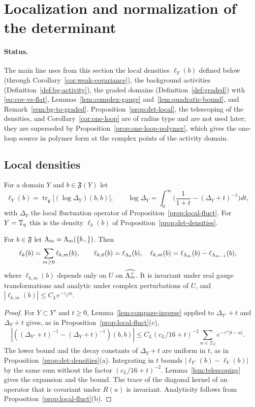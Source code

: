 \section{Localization and normalization of the determinant}\label{sec:det-local}

\paragraph{Status.} The main line uses from this section the local densities $\ell_Y(b)$ defined below (through Corollary~\ref{cor:weak-covariance}), the background activities (Definition~\ref{def:bg-activity}), the graded domains (Definition~\ref{def:graded}) with \eqref{eq:cov-vs-flat}, Lemmas~\ref{lem:complex-gauge} and~\ref{lem:quadratic-bound}, and Remark~\ref{rem:bg-to-graded}. Proposition~\ref{prop:det-local}, the telescoping of the densities, and Corollary~\ref{cor:one-loop} are of radius type and are not used later; they are superseded by Proposition~\ref{prop:one-loop-polymer}, which gives the one-loop source in polymer form at the complex points of the activity domain.

\subsection{Local densities}

For a domain $Y$ and $b\in\mathfrak F(Y)$ let
\[
\ell_Y(b)=\operatorname{tr}_{\mathfrak g}\big[(\log\Delta_Y)(b,b)\big],\qquad\log\Delta_Y=\int_0^\infty\Big(\frac1{1+t}-(\Delta_Y+t)^{-1}\Big)dt,
\]
with $\Delta_Y$ the local fluctuation operator of Proposition~\ref{prop:local-fluct}. For $Y=\mathbb T_\eta$ this is the density $\ell_k(b)$ of Proposition~\ref{prop:det-densities}.

\begin{proposition}\label{prop:det-local}
For $b\in\mathfrak F$ let $\Lambda_m=\Lambda_m(\{b_-\})$. Then
\[
\ell_k(b)=\sum_{m\ge0}\ell_{k,m}(b),\qquad\ell_{k,0}(b)=\ell_{\Lambda_0}(b),\quad\ell_{k,m}(b)=\ell_{\Lambda_m}(b)-\ell_{\Lambda_{m-1}}(b),
\]
where $\ell_{k,m}(b)$ depends only on $U$ on $\widehat{\Lambda_m^+}$. It is invariant under real gauge transformations and analytic under complex perturbations of $U$, and $|\ell_{k,m}(b)|\le C_Le^{-\gamma_3m}$.
\end{proposition}

\begin{proof}
For $Y\subset Y'$ and $t\ge0$, Lemma~\ref{lem:compare-inverse} applied to $\Delta_{Y'}+t$ and $\Delta_Y+t$ gives, as in Proposition~\ref{prop:local-fluct}(c),
\[
|((\Delta_{Y'}+t)^{-1}-(\Delta_Y+t)^{-1})(b,b)|\le C_L(c_L/16+t)^{-2}\sum_{w\in\Sigma_Y}e^{-\gamma''|b-w|} .
\]
The lower bound and the decay constants of $\Delta_Y+t$ are uniform in $t$, as in Proposition~\ref{prop:det-densities}(a). Integrating in $t$ bounds $|\ell_{Y'}(b)-\ell_Y(b)|$ by the same sum without the factor $(c_L/16+t)^{-2}$. Lemma~\ref{lem:telescoping} gives the expansion and the bound. The trace of the diagonal kernel of an operator that is covariant under $R(u)$ is invariant. Analyticity follows from Proposition~\ref{prop:local-fluct}(b).
\end{proof}

